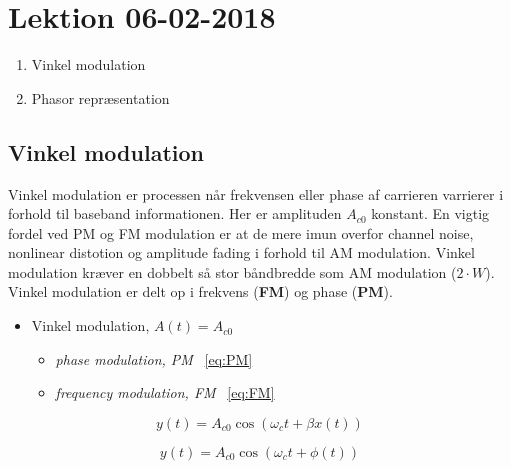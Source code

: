 \section{Lektion 06-02-2018}

\begin{enumerate}
	\item Vinkel modulation
	\item Phasor repræsentation
\end{enumerate}

\noindent{} \vspace{3mm}

\subsection{Vinkel modulation}
Vinkel modulation er processen når frekvensen eller phase af carrieren varrierer i forhold til baseband informationen. Her er amplituden $A_{c0}$ konstant. En vigtig fordel ved PM og FM modulation er at de mere imun overfor channel noise, nonlinear distotion og amplitude fading i forhold til AM modulation. Vinkel modulation kræver en dobbelt så stor båndbredde som AM modulation ($2\cdot W$). \\

\noindent Vinkel modulation er delt op i frekvens (\textbf{FM}) og phase (\textbf{PM}).

\begin{itemize}
	\item Vinkel modulation, $A(t) = A_{c0}$
	\begin{itemize}
		\item \textit{phase modulation, PM} ~\ref{eq:PM}
		\item \textit{frequency modulation, FM} ~\ref{eq:FM}
	\end{itemize}
\end{itemize} 

\begin{equation}\label{eq:PM}
y(t) = A_{c0} \cos(\omega_c t + \beta x(t))
\end{equation}

\begin{equation}\label{eq:FM}
y(t) = A_{c0} \cos(\omega_c t + \phi(t))
\end{equation}

